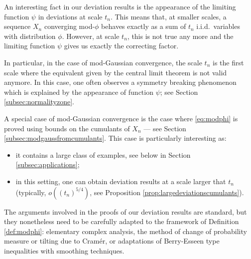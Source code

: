 \documentclass[12pt,a4paper,reqno]{amsart}
\theoremstyle{remark}
\begin{document}

\noindent An interesting fact in our deviation results is the appearance of the limiting function $\psi$ in deviations at scale $t_n$. This means that, at smaller scales, a sequence $X_n$ converging mod-$\phi$ behaves exactly as a sum of $t_n$ i.i.d.~variables with distribution $\phi$. However, at scale $t_n$, this is not true any more and the limiting function $\psi$ gives us exactly the correcting factor.\medskip

In particular, in the case of mod-Gaussian convergence, the scale $t_n$ is the first scale where the equivalent given by the central limit theorem is not valid anymore. In this case, one often observes a symmetry breaking phenomenon
which is explained by the appearance of function $\psi$; see Section \ref{subsec:normalityzone}.
\bigskip


A special case of mod-Gaussian convergence is the case where \eqref{eq:modphi} is proved using bounds on the cumulants of $X_n$ --- see Section \ref{subsec:modgaussfromcumulants}. This case is particularly interesting as:\vspace{2mm}
\begin{itemize}
    \item it contains a large class of examples, see below in Section \ref{subsec:applications};\vspace{2mm}
    \item in this setting, one can obtain deviation results at a scale larger that $t_n$ (typically, $o((t_n)^{5/4})$, see Proposition \ref{prop:largedeviationscumulants}).\vspace{2mm}
\end{itemize}


The arguments involved in the proofs of our deviation results are standard, but they nonetheless need to be carefully adapted to the framework of Definition \ref{def:modphi}: elementary complex analysis, the method of change of probability measure or tilting due to Cram\'er, or adaptations of Berry-Esseen type inequalities with smoothing techniques. 
\bigskip
\end{document}
